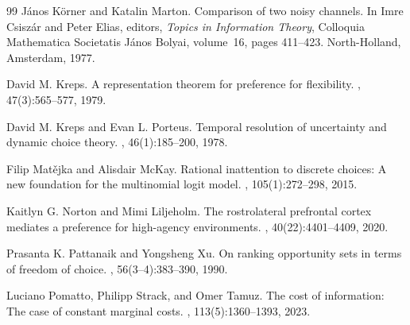 \documentclass[11pt,a4paper]{article}
\theoremstyle{definition}
\newcommand{\1}{\mathbf 1}
\begin{document}
\begin{thebibliography}{99}
J\'anos K\"orner and Katalin Marton.
\newblock Comparison of two noisy channels.
\newblock In Imre Csisz\'ar and Peter Elias, editors, {\em Topics in Information Theory}, Colloquia Mathematica
  Societatis J\'anos Bolyai, volume~16, pages 411--423. North-Holland, Amsterdam, 1977.

David M. Kreps.
\newblock A representation theorem for preference for flexibility.
, 47(3):565--577, 1979.

David M. Kreps and Evan L. Porteus.
\newblock Temporal resolution of uncertainty and dynamic choice theory.
, 46(1):185--200, 1978.


Filip Mat\v{e}jka and Alisdair McKay.
\newblock Rational inattention to discrete choices: A new foundation for the multinomial logit model.
, 105(1):272--298, 2015.


Kaitlyn G. Norton and Mimi Liljeholm.
\newblock The rostrolateral prefrontal cortex mediates a preference for high-agency environments.
, 40(22):4401--4409, 2020.


Prasanta K. Pattanaik and Yongsheng Xu.
\newblock On ranking opportunity sets in terms of freedom of choice.
, 56(3--4):383--390, 1990.

Luciano Pomatto, Philipp Strack, and Omer Tamuz.
\newblock The cost of information: The case of constant marginal costs.
, 113(5):1360--1393, 2023.


\end{thebibliography}
\end{document}

